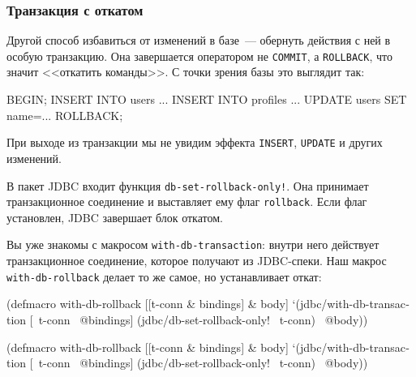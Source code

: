 \fi

\subsubsection*{Транзакция с откатом}



Другой способ избавиться от изменений в базе~--- обернуть действия с ней в
особую транзакцию. Она завершается оператором не \verb|COMMIT|, а
\verb|ROLLBACK|, что значит <<откатить команды>>. С точки зрения базы это
выглядит так:

\begin{english}
  \begin{sql}
BEGIN;
INSERT INTO users ...
INSERT INTO profiles ...
UPDATE users SET name=...
ROLLBACK;
  \end{sql}
\end{english}

При выходе из транзакции мы не увидим эффекта \verb|INSERT|, \verb|UPDATE| и
других изменений.

В пакет JDBC входит функция \verb|db-set-rollback-only!|. Она принимает
транзакционное соединение и выставляет ему флаг \verb|rollback|. Если флаг
установлен, JDBC завершает блок откатом.


Вы уже знакомы с макросом \verb|with-db-transaction|: внутри него действует
транзакционное соединение, которое получают из JDBC-спеки. Наш макрос
\verb|with-db-rollback| делает то же самое, но устанавливает откат:

\ifx\devicetype\mobile

\begin{english}
  \begin{clojure}
(defmacro with-db-rollback
  [[t-conn & bindings] & body]
  `(jdbc/with-db-transaction
     [~t-conn ~@bindings]
     (jdbc/db-set-rollback-only!
       ~t-conn)
     ~@body))
  \end{clojure}
\end{english}

\else

\begin{english}
  \begin{clojure}
(defmacro with-db-rollback
  [[t-conn & bindings] & body]
  `(jdbc/with-db-transaction [~t-conn ~@bindings]
     (jdbc/db-set-rollback-only! ~t-conn)
     ~@body))
  \end{clojure}
\end{english}

